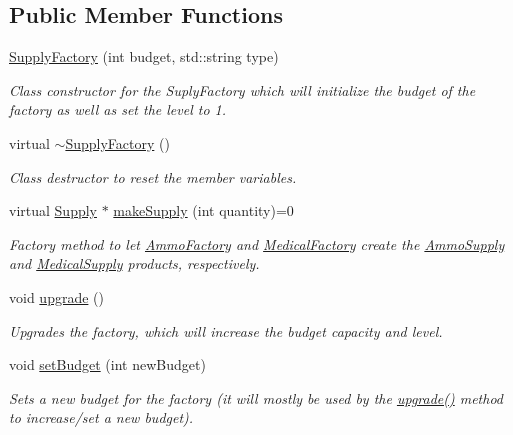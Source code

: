 \subsection*{Public Member Functions}
\begin{DoxyCompactItemize}
\item 
\mbox{\hyperlink{class_supply_factory_a3ba27cc94d78eadf7b832f93dce23263}{Supply\+Factory}} (int budget, std\+::string type)
\begin{DoxyCompactList}\small\item\em Class constructor for the Suply\+Factory which will initialize the budget of the factory as well as set the level to 1. \end{DoxyCompactList}\item 
virtual \mbox{\hyperlink{class_supply_factory_a04ca5073b6c72efcde47ddc300c2cf47}{$\sim$\+Supply\+Factory}} ()
\begin{DoxyCompactList}\small\item\em Class destructor to reset the member variables. \end{DoxyCompactList}\item 
virtual \mbox{\hyperlink{class_supply}{Supply}} $\ast$ \mbox{\hyperlink{class_supply_factory_a110ff7418c656661e935a33e49300722}{make\+Supply}} (int quantity)=0
\begin{DoxyCompactList}\small\item\em Factory method to let \mbox{\hyperlink{class_ammo_factory}{Ammo\+Factory}} and \mbox{\hyperlink{class_medical_factory}{Medical\+Factory}} create the \mbox{\hyperlink{class_ammo_supply}{Ammo\+Supply}} and \mbox{\hyperlink{class_medical_supply}{Medical\+Supply}} products, respectively. \end{DoxyCompactList}\item 
void \mbox{\hyperlink{class_supply_factory_af3930f1f67a23500a56e52045d4c9f67}{upgrade}} ()
\begin{DoxyCompactList}\small\item\em Upgrades the factory, which will increase the budget capacity and level. \end{DoxyCompactList}\item 
void \mbox{\hyperlink{class_supply_factory_aa5d3ab719c7a296b8cfd2ca33eb833ba}{set\+Budget}} (int new\+Budget)
\begin{DoxyCompactList}\small\item\em Sets a new budget for the factory (it will mostly be used by the \mbox{\hyperlink{class_supply_factory_af3930f1f67a23500a56e52045d4c9f67}{upgrade()}} method to increase/set a new budget). \end{DoxyCompactList}\item 

\end{DoxyCompactItemize}
